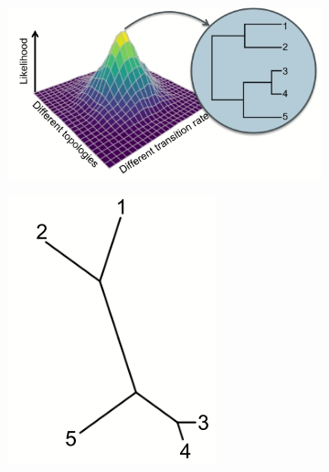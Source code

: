 \documentclass[]{article}
\begin{document}
\begin{figure}[H]
	\caption{Unrooted phylogeny arises because mutation process is reversible in our models}\label{fig:unrooted:phylogeny}
	\begin{subfigure}[b]{0.45\textwidth}
		\includegraphics[width=\textwidth]{InferringPastHard1}
	\end{subfigure}
	\begin{subfigure}[b]{0.45\textwidth}
		\includegraphics[width=\textwidth]{InferringPastHard2}
	\end{subfigure}
\end{figure}
\end{document}
